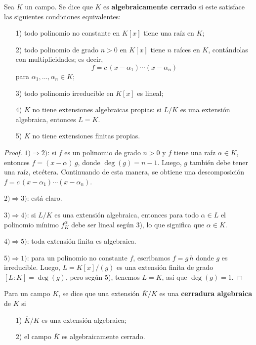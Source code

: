 \begin{proposicion-definicion}
  Sea $K$ un campo. Se dice que $K$ es \textbf{algebraicamente cerrado}
  si este satisface las siguientes condiciones equivalentes:
  \begin{enumerate}
  \item[1)] todo polinomio no constante en $K [x]$ tiene una raíz en $K$;

  \item[2)] todo polinomio de grado $n > 0$ en $K [x]$ tiene $n$ raíces en $K$,
    contándolas con multiplicidades; es decir,
    $$f = c\,(x-\alpha_1)\cdots (x - \alpha_n)$$
    para $\alpha_1,\ldots,\alpha_n \in K$;

  \item[3)] todo polinomio irreducible en $K [x]$ es lineal;

  \item[4)] $K$ no tiene extensiones algebraicas propias: si $L/K$ es una
    extensión algebraica, entonces $L = K$.

  \item[5)] $K$ no tiene extensiones finitas propias.
  \end{enumerate}
  
  \begin{proof}
    $1)\Rightarrow 2)$: si $f$ es un polinomio de grado $n > 0$ y $f$ tiene una
    raíz $\alpha\in K$, entonces $f = (x-\alpha)\,g$, donde
    $\deg (g) = n-1$. Luego, $g$ también debe tener una raíz,
    etcétera. Continuando de esta manera, se obtiene una descomposición
    $f = c\,(x-\alpha_1)\cdots (x - \alpha_n)$.

    $2)\Rightarrow 3)$: está claro.

    $3)\Rightarrow 4)$: si $L/K$ es una extensión algebraica, entonces para todo
    $\alpha \in L$ el polinomio mínimo $f^\alpha_K$ debe ser lineal según 3),
    lo que significa que $\alpha \in K$.

    $4)\Rightarrow 5)$: toda extensión finita es algebraica.

    $5)\Rightarrow 1)$: para un polinomio no constante $f$, escribamos $f =
    g\,h$ donde $g$ es irreducible. Luego, $L = K [x] / (g)$ es una extensión
    finita de grado $[L:K] = \deg (g)$, pero según 5), tenemos $L = K$, así que
    $\deg (g) = 1$.
  \end{proof}
\end{proposicion-definicion}

\begin{definicion}
  Para un campo $K$, se dice que una extensión $\overline{K}/K$ es una
  \textbf{cerradura algebraica} de $K$ si

  \begin{enumerate}
  \item[1)] $\overline{K}/K$ es una extensión algebraica;

  \item[2)] el campo $\overline{K}$ es algebraicamente cerrado.
  \end{enumerate}
\end{definicion}

